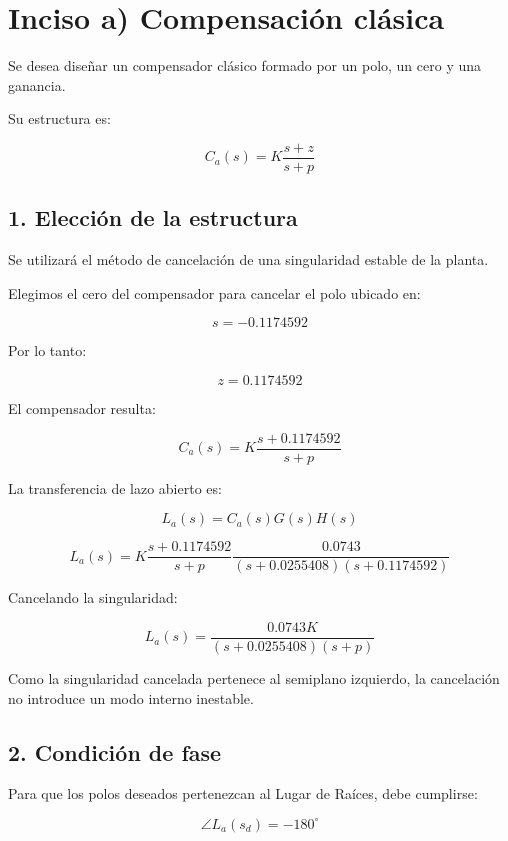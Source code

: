 \documentclass[10pt]{article}
\begin{document}
\section*{Inciso a) Compensación clásica}

Se desea diseñar un compensador clásico
formado por un polo, un cero y una ganancia.

Su estructura es:

\begin{equation}
    \boxed{
    C_a(s)=K\frac{s+z}{s+p}
    }
\end{equation}

\subsection*{1. Elección de la estructura}

Se utilizará el método de cancelación de
una singularidad estable de la planta.

Elegimos el cero del compensador para
cancelar el polo ubicado en:

\[
s=-0.1174592
\]

Por lo tanto:

\[
z=0.1174592
\]

El compensador resulta:

\[
C_a(s)=K\frac{s+0.1174592}{s+p}
\]

La transferencia de lazo abierto es:

\[
L_a(s)=C_a(s)G(s)H(s)
\]

\[
L_a(s)=
K\frac{s+0.1174592}{s+p}
\frac{0.0743}
{(s+0.0255408)(s+0.1174592)}
\]

Cancelando la singularidad:

\begin{equation}
    \boxed{
    L_a(s)=
    \frac{0.0743K}
    {(s+0.0255408)(s+p)}
    }
\end{equation}

Como la singularidad cancelada pertenece
al semiplano izquierdo, la cancelación
no introduce un modo interno inestable.

\subsection*{2. Condición de fase}

Para que los polos deseados pertenezcan
al Lugar de Raíces, debe cumplirse:

\begin{equation}
    \angle L_a(s_d)=-180^\circ
\end{equation}
\end{document}

